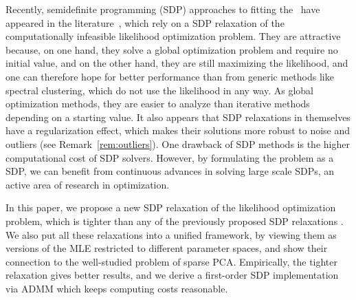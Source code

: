 Recently, semidefinite programming (SDP) approaches to fitting the \SBM\ have appeared in the literature~\cite{Chen2012,Chen2014,Cai2014}, which rely on a SDP relaxation of the computationally infeasible likelihood optimization problem.   They are attractive because, on one hand, they solve a global optimization problem and require no initial value, and on the other hand, they are still maximizing the likelihood,  and one can therefore hope for better performance than from generic methods like spectral clustering, which do not use the likelihood in any way.  As global optimization methods, they are easier to analyze than iterative methods depending on a starting value.  It also appears that SDP relaxations in themselves have a regularization effect, which makes their solutions more robust to noise and outliers (see  Remark~\ref{rem:outliers}).    One drawback of SDP methods is the higher computational cost of SDP solvers.  However, by formulating the problem as a SDP, we can benefit from continuous advances in solving large scale SDPs, an active area of research in optimization. 


In this paper, we propose a new SDP relaxation of the likelihood optimization problem, which is tighter than any of the previously proposed SDP relaxations \cite{Chen2012,Chen2014,Cai2014}.   We also put all these relaxations into a unified framework, by viewing them as versions of the MLE restricted to different parameter spaces, and show their connection to the well-studied problem of sparse PCA.   Empirically, the tighter relaxation gives better results, and we derive a first-order SDP implementation via ADMM which keeps computing costs reasonable.   


